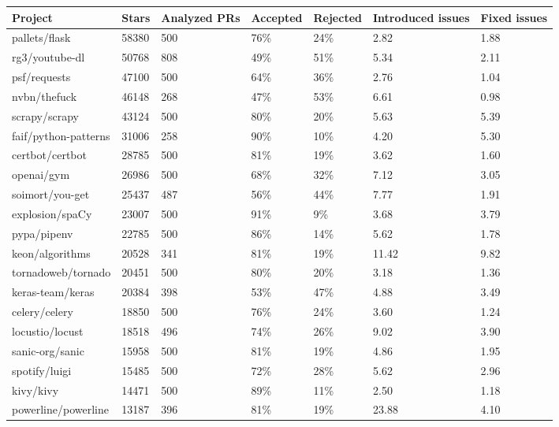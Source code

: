 \begin{tabular}{|p{4cm}p{0.8cm}p{1cm}p{1cm}p{1cm}p{1.2cm}p{0.8cm}|}
  \hline
Project & Stars & Analyzed PRs & Accepted & Rejected & Introduced issues & Fixed issues \\ 
  \hline \hline
pallets/flask & 58380 & 500 & 76\% & 24\% & 2.82 & 1.88 \\ 
  rg3/youtube-dl & 50768 & 808 & 49\% & 51\% & 5.34 & 2.11 \\ 
  psf/requests & 47100 & 500 & 64\% & 36\% & 2.76 & 1.04 \\ 
  nvbn/thefuck & 46148 & 268 & 47\% & 53\% & 6.61 & 0.98 \\ 
  scrapy/scrapy & 43124 & 500 & 80\% & 20\% & 5.63 & 5.39 \\ 
  faif/python-patterns & 31006 & 258 & 90\% & 10\% & 4.20 & 5.30 \\ 
  certbot/certbot & 28785 & 500 & 81\% & 19\% & 3.62 & 1.60 \\ 
  openai/gym & 26986 & 500 & 68\% & 32\% & 7.12 & 3.05 \\ 
  soimort/you-get & 25437 & 487 & 56\% & 44\% & 7.77 & 1.91 \\ 
  explosion/spaCy & 23007 & 500 & 91\% & 9\% & 3.68 & 3.79 \\ 
  pypa/pipenv & 22785 & 500 & 86\% & 14\% & 5.62 & 1.78 \\ 
  keon/algorithms & 20528 & 341 & 81\% & 19\% & 11.42 & 9.82 \\ 
  tornadoweb/tornado & 20451 & 500 & 80\% & 20\% & 3.18 & 1.36 \\ 
  keras-team/keras & 20384 & 398 & 53\% & 47\% & 4.88 & 3.49 \\ 
  celery/celery & 18850 & 500 & 76\% & 24\% & 3.60 & 1.24 \\ 
  locustio/locust & 18518 & 496 & 74\% & 26\% & 9.02 & 3.90 \\ 
  sanic-org/sanic & 15958 & 500 & 81\% & 19\% & 4.86 & 1.95 \\ 
  spotify/luigi & 15485 & 500 & 72\% & 28\% & 5.62 & 2.96 \\ 
  kivy/kivy & 14471 & 500 & 89\% & 11\% & 2.50 & 1.18 \\ 
  powerline/powerline & 13187 & 396 & 81\% & 19\% & 23.88 & 4.10 \\ 
   \hline
\end{tabular}
